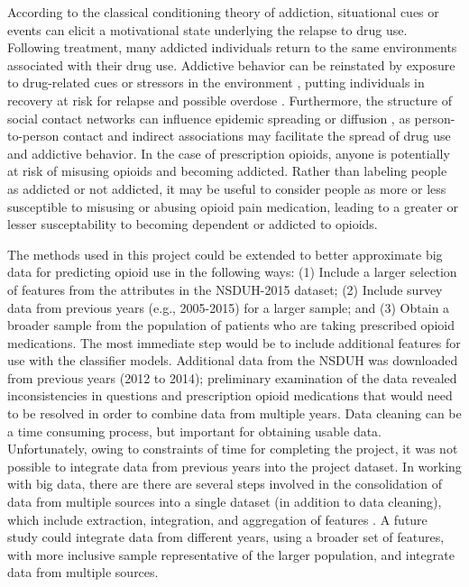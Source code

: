 
According to the classical conditioning theory of addiction, situational cues 
or events can elicit a motivational state underlying the relapse to drug use. 
Following treatment, many addicted individuals return to the same environments 
associated with their drug use. Addictive behavior can be reinstated by exposure 
to drug-related cues or stressors in the environment \cite{shaham03}, putting
individuals in recovery at risk for relapse and possible overdose \cite{johnson11}. 
Furthermore, the structure of social contact networks can influence epidemic 
spreading or diffusion \cite{pastor01, watts98}, as person-to-person contact 
and indirect associations may facilitate the spread of drug use and addictive 
behavior. In the case of prescription opioids, anyone is potentially at 
risk of misusing opioids and becoming addicted. Rather than labeling people 
as addicted or not addicted, it may be useful to consider people as more or 
less susceptible to misusing or abusing opioid pain medication, leading to
a greater or lesser susceptability to becoming dependent or addicted to opioids.


The methods used in this project could be extended to better approximate big 
data for predicting opioid use in the following ways: (1) Include a larger 
selection of features from the attributes in the NSDUH-2015 dataset; (2) 
Include survey data from previous years (e.g., 2005-2015) for a larger sample;  
and (3) Obtain a broader sample from the population of patients who are 
taking prescribed opioid medications. The most immediate step would be to 
include additional features for use with the classifier models. Additional 
data from the NSDUH was downloaded from previous years (2012 to 2014); 
preliminary examination of the data revealed inconsistencies in questions 
and prescription opioid medications that would need to be resolved in order 
to combine data from multiple years. Data cleaning can be a time consuming 
process, but important for obtaining usable data. Unfortunately, owing to 
constraints of time for completing the project, it was not possible to
integrate data from previous years into the project dataset. In working with
big data, there are there are several steps involved in the consolidation of 
data from multiple sources into a single dataset (in addition to data 
cleaning), which include extraction, integration, and aggregation of features  
\cite{rahm00}. A future study could integrate data from different years, 
using a broader set of features, with more inclusive sample representative
of the larger population, and integrate data from multiple sources. 

